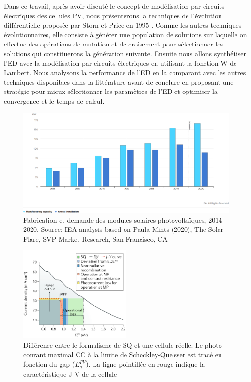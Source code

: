 Dans ce travail, après avoir discuté le concept de modélisation par circuits électriques des cellules PV, nous présenterons la techniques de l'évolution différentielle proposée par Storn et Price en 1995 \cite{Storn1995}. Comme les autres techniques évolutionnaires, elle consiste à générer une population de solutions sur laquelle on effectue des opérations de mutation et de croisement pour sélectionner les solutions qui constituerons la génération suivante. Ensuite nous allons synthétiser l'ED avec la modélisation par circuits électriques en utilisant la fonction W de Lambert. Nous analysons la performance de l'ED en la comparant avec les autres techniques disponibles dans la littérature avant de conclure en proposant une stratégie pour mieux sélectionner les paramètres de l'ED et optimiser la convergence et le temps de calcul.
\begin{figure}
  \begin{center}
    \includegraphics[width=\textwidth]{resources/ieapv.png}
    \caption{Fabrication et demande des modules solaires photovoltaïques, 2014-2020. Source: IEA analysis based on Paula Mints (2020), The Solar Flare, SVP Market Research, San Francisco, CA \cite{iea2020}}
    \label{fig:ieapv}
  \end{center}
\end{figure}
\begin{figure}
  \begin{center}
    \includegraphics[width=0.5\textwidth]{resources/natsq.png}
    \caption{Différence entre le formalisme de SQ et une cellule réelle. Le photo-courant maximal CC à la limite de Schockley-Queisser est tracé en fonction du gap ($E_{g}^{PV}$). La ligne pointillée en rouge indique la caractéristique J-V de la cellule \cite{nayak2019}}
    \label{fig:natsq}
  \end{center}
\end{figure}
